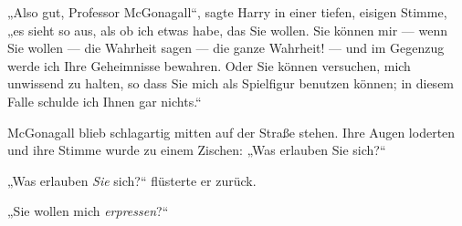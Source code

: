 „Also gut, Professor McGonagall“, sagte Harry in einer tiefen, eisigen Stimme, „es sieht so aus, als ob ich etwas habe, das Sie wollen. Sie können mir — wenn Sie wollen — die Wahrheit sagen — die ganze Wahrheit! — und im Gegenzug werde ich Ihre Geheimnisse bewahren. Oder Sie können versuchen, mich unwissend zu halten, so dass Sie mich als Spielfigur benutzen können; in diesem Falle schulde ich Ihnen gar nichts.“

McGonagall blieb schlagartig mitten auf der Straße stehen. Ihre Augen loderten und ihre Stimme wurde zu einem Zischen:
„Was erlauben Sie sich?“

„Was erlauben \emph{Sie} sich?“ flüsterte er zurück.

„Sie wollen mich \emph{erpressen}?“


